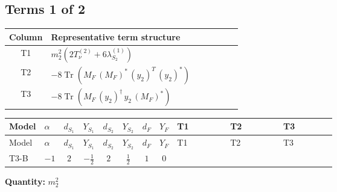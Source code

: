 \documentclass[8pt]{article}
\begin{document}
\begin{landscape}
\subsection*{Terms 1 of 2}
\begin{center}
\begin{tabular}{@{}c >{\raggedright\arraybackslash}p{0.82\linewidth}@{}}
\toprule
Column & Representative term structure \\
\midrule
T1 & \(\displaystyle {m_2^2} (2 T_{\nu}^{(2)}+6 {\lambda_{S_2}^{(1)}})\) \\
\midrule
T2 & \(\displaystyle -8 \operatorname{Tr}\!\left({M_F}\,\left({M_F}\right)^{*}\,\left({y_2}\right)^{T}\,\left({y_2}\right)^{*}\right)\) \\
\midrule
T3 & \(\displaystyle -8 \operatorname{Tr}\!\left({M_F}\,\left({y_2}\right)^{\dagger}\,{y_2}\,\left({M_F}\right)^{*}\right)\) \\
\midrule
\bottomrule
\end{tabular}
\end{center}
\smallskip
\tiny
\begin{longtable}{@{}llcccccc >{\raggedright\arraybackslash}p{0.21\linewidth} >{\raggedright\arraybackslash}p{0.21\linewidth} >{\raggedright\arraybackslash}p{0.21\linewidth}@{}}
\toprule
Model & $\alpha$ & $d_{S_1}$ & $Y_{S_1}$ & $d_{S_2}$ & $Y_{S_2}$ & $d_F$ & $Y_F$ & T1 & T2 & T3 \\
\midrule
\endfirsthead
\toprule
Model & $\alpha$ & $d_{S_1}$ & $Y_{S_1}$ & $d_{S_2}$ & $Y_{S_2}$ & $d_F$ & $Y_F$ & T1 & T2 & T3 \\
\midrule
\endhead
T3-B & $-1$ & $2$ & $-\frac{1}{2}$ & $2$ & $\frac{1}{2}$ & $1$ & $0$ & \scriptsize\adjustbox{max width=\linewidth}{$\begin{gathered} {m_2^2} (2 T_{\nu}^{(2)}+6 {\lambda_{S_2}^{(1)}})\end{gathered}$} & \scriptsize\adjustbox{max width=\linewidth}{$\begin{gathered} -8 \operatorname{Tr}\!\left({M_F}\,\left({M_F}\right)^{*}\,\left({y_2}\right)^{T}\,\left({y_2}\right)^{*}\right)\end{gathered}$} & \scriptsize\adjustbox{max width=\linewidth}{$\begin{gathered} -8 \operatorname{Tr}\!\left({M_F}\,\left({y_2}\right)^{\dagger}\,{y_2}\,\left({M_F}\right)^{*}\right)\end{gathered}$} \\
\midrule
\bottomrule
\end{longtable}
\clearpage
\noindent\textbf{Quantity: }$m_2^2$\par\smallskip

\end{landscape}
\end{document}
